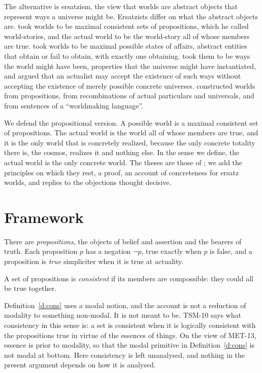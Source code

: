 \documentclass{situationist-preprint}
\begin{document}
The alternative is ersatzism, the view that worlds are abstract objects that represent ways a universe might be. Ersatzists differ on what the abstract objects are. \citet{Adams1974} took worlds to be maximal consistent sets of propositions, which he called world-stories, and the actual world to be the world-story all of whose members are true. \citet{Plantinga1974,Plantinga1976} took worlds to be maximal possible states of affairs, abstract entities that obtain or fail to obtain, with exactly one obtaining. \citet{Stalnaker1976} took them to be ways the world might have been, properties that the universe might have instantiated, and argued that an actualist may accept the existence of such ways without accepting the existence of merely possible concrete universes. \citet{Fine1977} constructed worlds from propositions, \citet{Armstrong1989} from recombinations of actual particulars and universals, and \citet{Sider2002} from sentences of a \enquote{worldmaking language}.

We defend the propositional version. A possible world is a maximal consistent set of propositions. The actual world is the world all of whose members are true, and it is the only world that is concretely realized, because the only concrete totality there is, the cosmos, realizes it and nothing else. In the sense we define, the actual world is the only concrete world. The theses are those of \citet{Adams1974}; we add the principles on which they rest, a proof, an account of concreteness for ersatz worlds, and replies to the objections thought decisive.

\section{Framework}

\begin{definition}[Propositions]\label{d:prop}
There are \emph{propositions}, the objects of belief and assertion and the bearers of truth. Each proposition $p$ has a negation $\neg p$, true exactly when $p$ is false, and a proposition is \emph{true} simpliciter when it is true at actuality.
\end{definition}

\begin{definition}[Consistency]\label{d:cons}
A set of propositions is \emph{consistent} if its members are compossible: they could all be true together.
\end{definition}

Definition~\ref{d:cons} uses a modal notion, and the account is not a reduction of modality to something non-modal. It is not meant to be. TSM-10 says what consistency in this sense is: a set is consistent when it is logically consistent with the propositions true in virtue of the essences of things. On the view of MET-13, essence is prior to modality, so that the modal primitive in Definition~\ref{d:cons} is not modal at bottom. Here consistency is left unanalysed, and nothing in the present argument depends on how it is analysed.
\end{document}
